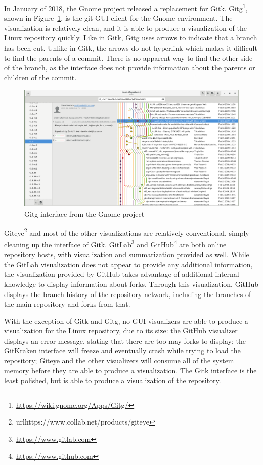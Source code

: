 In January of 2018, the Gnome project released a replacement for Gitk.
Gitg\footnote{\url{https://wiki.gnome.org/Apps/Gitg/}},
shown in Figure~\ref{fig:gitg_screenshot},
is the git GUI client for the Gnome environment.
The visualization is relatively clean, and it is able to produce a
visualization of the Linux repository quickly.
Like in Gitk, Gitg uses arrows to indicate that a branch has been cut.
Unlike in Gitk, the arrows do not hyperlink which makes it difficult to
find the parents of a commit.
There is no apparent way to find the other side of the branch,
as the interface does not provide information about the parents or
children of the commit.

\begin{figure}[htpb]
  \centering
  \includegraphics[width=0.8\linewidth]{Figures/introduction/gitg.png}
  \caption{Gitg interface from the Gnome project}
  \label{fig:gitg_screenshot}
\end{figure}

Giteye\footnote{url{https://www.collab.net/products/giteye}} and most of the other visualizations are relatively
conventional, simply cleaning up the interface of Gitk.
GitLab\footnote{\url{https://www.gitlab.com}} and
GitHub\footnote{\url{https://www.github.com}} are both online repository hosts, with
visualization and summarization provided as well. While the GitLab
visualization does not appear to provide any additional information, the
visualization provided by GitHub takes advantage of additional internal
knowledge to display information about forks. Through this
visualization, GitHub displays the branch history of the repository
network, including the branches of the main repository and forks from
that.

With the exception of Gitk and Gitg, no GUI visualizers
are able to produce a visualization for the Linux repository, due to its
size: the GitHub visualizer displays an error message, stating that
there are too may forks to display; the GitKraken interface will freeze
and eventually crash while trying to load the repository; Giteye
and the other visualizers will consume all of the system memory before
they are able to produce a visualization. The Gitk interface is the
least polished, but is able to produce a visualization of the
repository.

